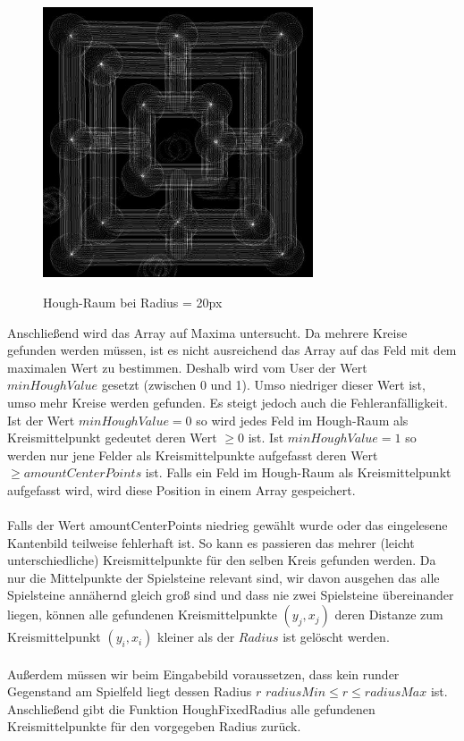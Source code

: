 \documentclass[paper=A4, deutsch]{scrartcl}
\begin{document}
\begin{figure}[ht]
	\centering
		\includegraphics[width=8cm]{Huffexample3_16.jpg}\\
	\caption[Hough-Raum bei Radius = 20px]{Hough-Raum bei Radius = 20px}
	\label{fig:houghfixed}
\end{figure}

Anschließend wird das Array auf Maxima untersucht. Da mehrere Kreise gefunden werden müssen, ist es nicht ausreichend das Array auf das Feld mit dem maximalen Wert zu bestimmen. Deshalb wird vom User der Wert \(minHoughValue\) gesetzt (zwischen 0 und 1). Umso niedriger dieser Wert ist, umso mehr Kreise werden gefunden. Es steigt jedoch auch die Fehleranfälligkeit. Ist der Wert \(minHoughValue = 0\) so wird jedes Feld im Hough-Raum als Kreismittelpunkt gedeutet deren Wert \(\geq 0\) ist. Ist \(minHoughValue = 1\) so werden nur jene Felder als Kreismittelpunkte aufgefasst deren Wert \(\geq amountCenterPoints\) ist.  Falls ein Feld im Hough-Raum als Kreismittelpunkt aufgefasst wird, wird diese Position in einem Array gespeichert. \\
\\
Falls der Wert amountCenterPoints niedrieg gewählt wurde oder das eingelesene Kantenbild teilweise fehlerhaft ist. So kann es passieren das mehrer (leicht unterschiedliche) Kreismittelpunkte für den selben Kreis gefunden werden. Da nur die Mittelpunkte der Spielsteine relevant sind, wir davon ausgehen das alle Spielsteine annähernd gleich groß sind und dass nie zwei Spielsteine übereinander liegen, können alle gefundenen Kreismittelpunkte \((y_{j}, x_{j})\) deren Distanze zum Kreismittelpunkt \((y_{i}, x_{i})\) kleiner als der \(Radius\) ist gelöscht werden. \\
\\
Außerdem müssen wir beim Eingabebild voraussetzen, dass kein runder Gegenstand am Spielfeld liegt dessen Radius \(r\)  \(radiusMin \leq r \leq radiusMax\) ist. 
Anschließend gibt die Funktion HoughFixedRadius alle gefundenen Kreismittelpunkte für den vorgegeben Radius zurück. \\
\end{document}
